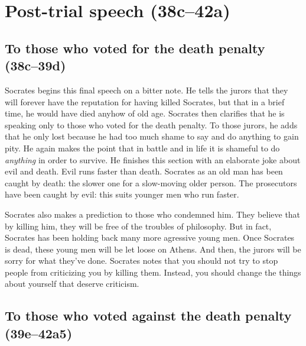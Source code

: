 \documentclass[11pt]{article}
\begin{document}

\section{Post-trial speech (38c--42a)}

\subsection{To those who voted for the death penalty (38c--39d)}

Socrates begins this final speech on a bitter note.  He tells the jurors that they will forever have the reputation for having killed Socrates, but that in a brief time, he would have died anyhow of old age.  Socrates then clarifies that he is speaking only to those who voted for the death penalty.  To those jurors, he adds that he only lost because he had too much shame to say and do anything to gain pity.  He again makes the point that in battle and in life it is shameful to do \emph{anything} in order to survive.  He finishes this section with an elaborate joke about evil and death. Evil runs faster than death.  Socrates as an old man has been caught by death: the slower one for a slow-moving older person.  The prosecutors have been caught by evil: this suits younger men who run faster.

Socrates also makes a prediction to those who condemned him.  They believe that by killing him, they will be free of the troubles of philosophy.  But in fact, Socrates has been holding back many more agressive young men.  Once Socrates is dead, these young men will be let loose on Athens.  And then, the jurors will be sorry for what they've done.  Socrates notes that you should not try to stop people from criticizing you by killing them.  Instead, you should change the things about yourself that deserve criticism.


\subsection{To those who voted against the death penalty (39e--42a5)}
\end{document}
